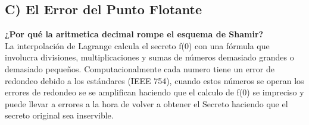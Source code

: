 \documentclass{article}
\begin{document}
\subsection{C) El Error del Punto Flotante}
\textbf{¿Por qué la aritmetica decimal rompe el esquema de Shamir?} \\

La interpolación de Lagrange calcula el secreto f(0) con una fórmula que involucra divisiones, multiplicaciones y sumas de números demasiado 
grandes o demasiado pequeños. Computacionalmente cada numero tiene un error de redondeo debido a los estándares (IEEE 754), cuando estos números 
se operan los errores de redondeo se se amplifican haciendo que el calculo de f(0) se impreciso y puede llevar a errores a la hora de volver a 
obtener el Secreto haciendo que el secreto original sea inservible.
\end{document}
